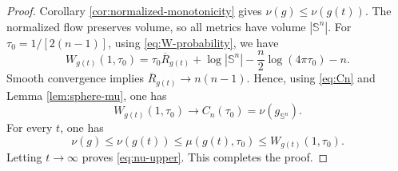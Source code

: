 \documentclass[11pt, reqno]{amsart}
\numberwithin{equation}{section}
\theoremstyle{remark}
\newcommand{\Sph}{\mathbb S}
\begin{document}
\begin{proof}
Corollary \ref{cor:normalized-monotonicity} gives
$\nu(g)\leq\nu(g(t))$.  The normalized flow preserves volume, so all metrics
have volume $|\Sph^n|$. For  $\tau_0=1/[2(n-1)]$,
using  \eqref{eq:W-probability},  we have
\begin{equation}\label{eq:constant-test-flow}
W_{g(t)}(1,\tau_0)
=\tau_0\overline R_{g(t)}+\log |\Sph^n|
-\frac n2\log(4\pi\tau_0)-n.
\end{equation}
Smooth convergence  implies 
$\overline R_{g(t)}\to n(n-1)$. Hence, using \eqref{eq:Cn} and Lemma \ref{lem:sphere-mu}, one has 
\begin{equation}\label{eq:constant-test-limit}
W_{g(t)}(1,\tau_0)\longrightarrow C_n(\tau_0)=\nu(g_{\Sph^n}).
\end{equation}
For every $t$, one has 
$$
\nu(g)\leq\nu(g(t))\leq\mu(g(t),\tau_0)
\leq W_{g(t)}(1,\tau_0).
$$
Letting $t\to\infty$ proves \eqref{eq:nu-upper}.  This completes the proof.
\end{proof}
\end{document}
